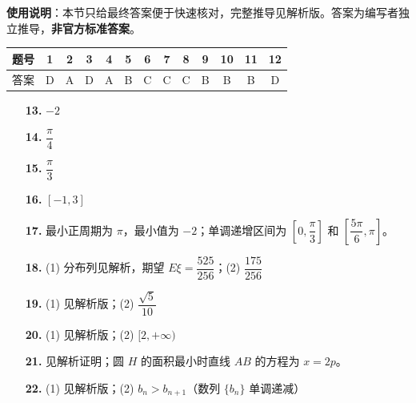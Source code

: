 
\begin{gknotice}
\textbf{使用说明}：本节只给最终答案便于快速核对，完整推导见解析版。答案为编写者独立推导，\textbf{非官方标准答案}。
\end{gknotice}

\begin{center}\begin{tabular}{ccccccccccccc}
\toprule
题号 & 1 & 2 & 3 & 4 & 5 & 6 & 7 & 8 & 9 & 10 & 11 & 12 \\
\midrule
答案 & D & A & D & A & B & C & C & C & B & B & B & D \\
\bottomrule
\end{tabular}\end{center}

\begin{itemize}[leftmargin=2.6em]
  \item[\textbf{13.}] $-2$
  \item[\textbf{14.}] $\dfrac{\pi}{4}$
  \item[\textbf{15.}] $\dfrac{\pi}{3}$
  \item[\textbf{16.}] $[-1, 3]$
\end{itemize}

\begin{itemize}[leftmargin=2.6em]
  \item[\textbf{17.}] 最小正周期为 $\pi$，最小值为 $-2$；单调递增区间为 $\left[0, \dfrac{\pi}{3}\right]$ 和 $\left[\dfrac{5\pi}{6}, \pi\right]$。
  \item[\textbf{18.}] (1) 分布列见解析，期望 $E\xi = \dfrac{525}{256}$；(2) $\dfrac{175}{256}$
  \item[\textbf{19.}] (1) 见解析版；(2) $\dfrac{\sqrt{5}}{10}$
  \item[\textbf{20.}] (1) 见解析版；(2) $[2, +\infty)$
  \item[\textbf{21.}] 见解析证明；圆 $H$ 的面积最小时直线 $AB$ 的方程为 $x = 2p$。
  \item[\textbf{22.}] (1) 见解析版；(2) $b_n > b_{n+1}$（数列 $\{b_n\}$ 单调递减）
\end{itemize}
